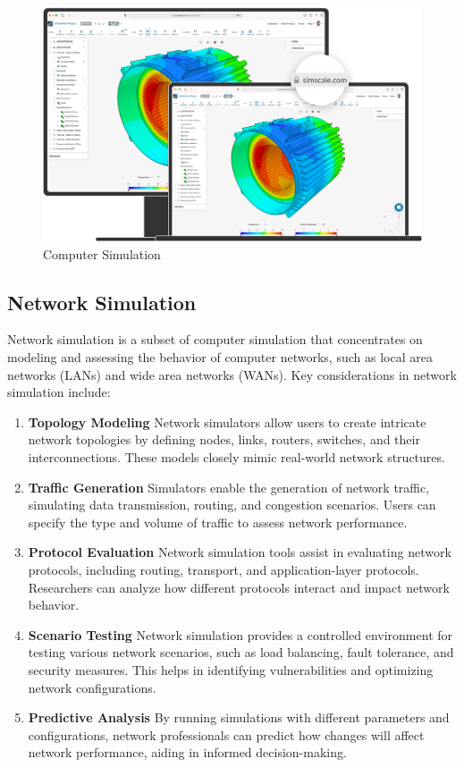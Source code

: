\documentclass[11pt]{article}
\begin{document}
\begin{figure}[H]
    \centering
    \includegraphics[width=.45\textwidth]{Simulation/Simulation_3.jpg}
    \caption{Computer Simulation}
\end{figure}

\subsection{Network Simulation}
Network simulation is a subset of computer simulation that concentrates on modeling and assessing the behavior of computer networks, such as local area networks (LANs) and wide area networks (WANs). Key considerations in network simulation include:

\begin{enumerate}
    \item \textbf{Topology Modeling} Network simulators allow users to create intricate network topologies by defining nodes, links, routers, switches, and their interconnections. These models closely mimic real-world network structures.

    \item \textbf{Traffic Generation} Simulators enable the generation of network traffic, simulating data transmission, routing, and congestion scenarios. Users can specify the type and volume of traffic to assess network performance.

    \item \textbf{Protocol Evaluation} Network simulation tools assist in evaluating network protocols, including routing, transport, and application-layer protocols. Researchers can analyze how different protocols interact and impact network behavior.

    \item \textbf{Scenario Testing} Network simulation provides a controlled environment for testing various network scenarios, such as load balancing, fault tolerance, and security measures. This helps in identifying vulnerabilities and optimizing network configurations.

    \item \textbf{Predictive Analysis} By running simulations with different parameters and configurations, network professionals can predict how changes will affect network performance, aiding in informed decision-making.
\end{enumerate}
\end{document}
